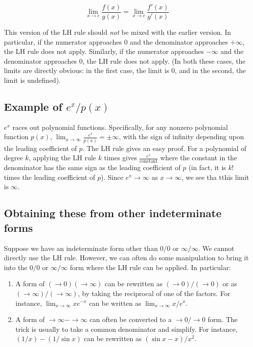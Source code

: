 \documentclass{amsart}
\begin{document}
$$\lim_{x \to c} \frac{f(x)}{g(x)} = \lim_{x \to c} \frac{f'(x)}{g'(x)}$$

This version of the LH rule should {\em not} be mixed with the earlier
version. In particular, if the numerator approaches $0$ and the
denominator approaches $+\infty$, the LH rule does not
apply. Similarly, if the numerator approaches $-\infty$ and the
denominator approaches $0$, the LH rule does not apply. (In both these
cases, the limits are directly obvious: in the first case, the limit
is $0$, and in the second, the limit is undefined).

\subsection{Example of $e^x/p(x)$}

$e^x$ races out polynomial functions. Specifically, for any nonzero
polynomial function $p(x)$, $\lim_{x \to \infty} \frac{e^x}{p(x)} =
\pm \infty$, with the sign of infinity depending upon the leading
coefficient of $p$. The LH rule gives an easy proof. For a polynomial
of degree $k$, applying the LH rule $k$ times gives
$\frac{e^x}{\text{constant}}$ where the constant in the denominator
has the same sign as the leading coefficient of $p$ (in fact, it is
$k!$ times the leading coefficient of $p$). Since $e^x \to \infty$ as
$x \to \infty$, we see tha tthis limit is $\infty$.

\subsection{Obtaining these from other indeterminate forms}

Suppose we have an indeterminate form other than $0/0$ or
$\infty/\infty$. We cannot directly use the LH rule. However, we can
often do some manipulation to bring it into the $0/0$ or
$\infty/\infty$ form where the LH rule can be applied. In particular:

\begin{enumerate}
\item A form of $(\to 0)(\to \infty)$ can be rewritten as $(\to
  0)/(\to 0)$ or as $(\to \infty)/(\to \infty)$, by taking the
  reciprocal of one of the factors. For instance, $\lim_{x \to \infty}
  xe^{-x}$ can be written as $\lim_{x \to \infty} x/e^x$.
\item A form of $\to \infty - \to \infty$ can often be converted to a
  $\to 0/\to 0$ form. The trick is usually to take a common
  denominator and simplify. For instance, $(1/x) - (1/\sin x)$ can be
  rewritten as $(\sin x - x)/x^2$.
\end{enumerate}
\end{document}
